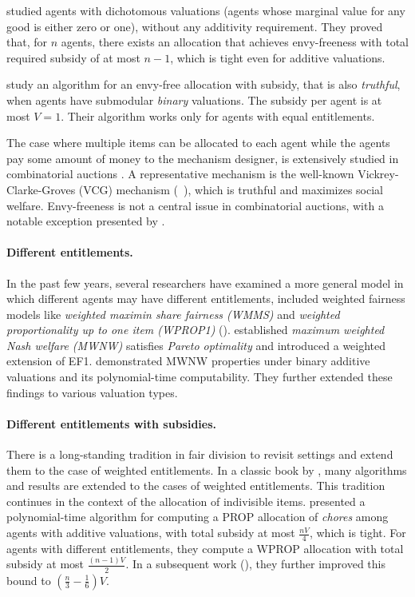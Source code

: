  \cite{barman2022achieving} studied agents with  dichotomous valuations (agents whose marginal value for any good is either zero or one), without any additivity requirement.
 They proved that, for $n$ agents, there exists an allocation that achieves envy-freeness with total required subsidy of at most $n-1$, which is tight even for additive valuations.
 
 \cite{Goko2024} study an algorithm for an envy-free allocation with subsidy, that is also \emph{truthful}, when agents have submodular \emph{binary} valuations. The subsidy per agent is at most $V=1$.
 Their algorithm works only for agents with equal entitlements.
 
 The case where multiple items can be allocated to each agent while the agents pay some amount of money to the mechanism designer, is extensively studied in combinatorial auctions \citep{cramton2006combinatorial}. A representative mechanism is the well-known Vickrey-Clarke-Groves (VCG)  mechanism (~\cite{clarke,groves:econometrica:1973,vickrey:1961}), 
 which is truthful and maximizes social welfare. Envy-freeness is not a central issue in combinatorial auctions, with a notable exception presented by \cite{Papa03b}.
 
 \paragraph{\textbf{Different entitlements.}}
 In the past few years, several researchers have examined a more general model in which different agents may have different entitlements, included weighted fairness models like \emph{weighted maximin share fairness (WMMS)} and \emph{weighted proportionality up to one item (WPROP1)} (\cite{chakraborty2021picking,BEF23a,ACL19a}).
 \cite{CISZ21} established \emph{maximum weighted Nash welfare (MWNW)} satisfies \emph{Pareto optimality} and introduced a weighted extension of EF1. \cite{suksompong2022maximum} demonstrated MWNW properties under binary additive valuations and its polynomial-time computability. They further extended these findings to various valuation types. 
 
 \paragraph{\textbf{Different entitlements with subsidies.}}
 There is a long-standing tradition in fair division to revisit settings and extend them to the case of weighted entitlements. In a classic book by \cite{BrTa96a}, many algorithms and results are extended to the cases of weighted entitlements. This tradition continues in the context of the allocation of indivisible items. 
 \cite{WuZZ23} presented a polynomial-time algorithm for computing 
 a PROP allocation of \emph{chores} among agents with additive valuations, with total subsidy at most $\frac{n  V}{4}$, which is tight.
 For agents with different entitlements, they compute a WPROP allocation with total subsidy at most $\frac{(n-1)  V}{2}$. 
 In a subsequent work (\cite{wu2024tree}), they further improved this bound to $(\frac{n}{3} - \frac{1}{6})V$. 
 
